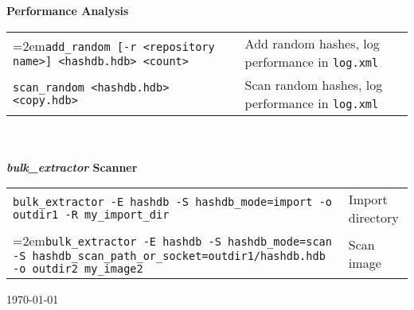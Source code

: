 \documentclass[12pt]{article}
\newcommand{\bulk}{\emph{bulk\_extractor}\xspace}
\begin{document}
\textbf{Performance Analysis}\\
\begin{tabular}{p{3.6 in} p{4 in}}
\hangindent=2em\small\texttt{add\_random [-r <repository name>] <hashdb.hdb> <count>} & Add random hashes, log performance in \texttt{log.xml}\\
\small\texttt{scan\_random <hashdb.hdb> <copy.hdb>} & Scan random hashes, log performance in \texttt{log.xml}\\
\end{tabular}
\\
\\
\textbf{\bulk Scanner}\\
\begin{tabular}{p{5.8 in} l}
\small\texttt{bulk\_extractor -E hashdb -S hashdb\_mode=import -o outdir1 -R my\_import\_dir} & Import directory\\
\hangindent=2em\small\texttt{bulk\_extractor -E hashdb -S hashdb\_mode=scan -S hashdb\_scan\_path\_or\_socket=outdir1/hashdb.hdb -o outdir2 my\_image2} & Scan image\\
\end{tabular}

\vspace{2mm}
\begin{center}
\begin{footnotesize}
\today
\end{footnotesize}
\end{center}
\end{document}
